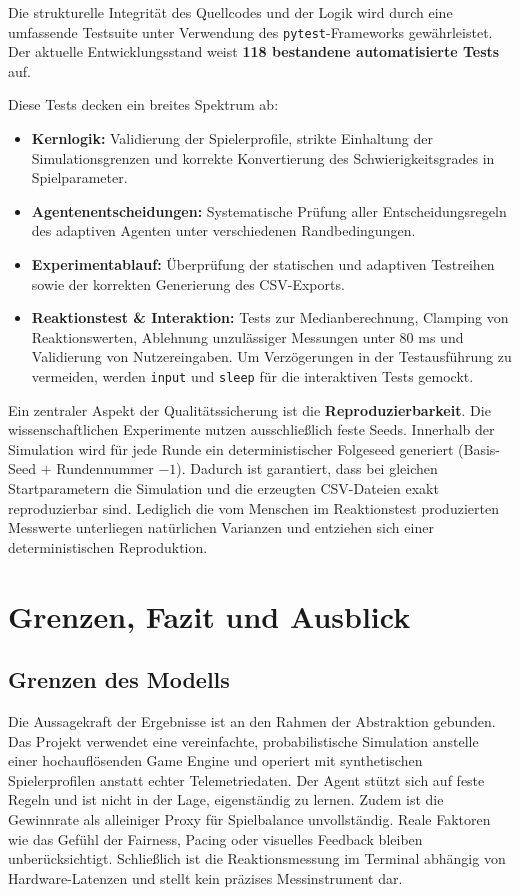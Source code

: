 \documentclass[11pt,a4paper]{article}
\begin{document}
Die strukturelle Integrität des Quellcodes und der Logik wird durch eine umfassende Testsuite unter Verwendung des \texttt{pytest}-Frameworks gewährleistet. Der aktuelle Entwicklungsstand weist \textbf{118 bestandene automatisierte Tests} auf.

Diese Tests decken ein breites Spektrum ab:
\begin{itemize}
    \item \textbf{Kernlogik:} Validierung der Spielerprofile, strikte Einhaltung der Simulationsgrenzen und korrekte Konvertierung des Schwierigkeitsgrades in Spielparameter.
    \item \textbf{Agentenentscheidungen:} Systematische Prüfung aller Entscheidungsregeln des adaptiven Agenten unter verschiedenen Randbedingungen.
    \item \textbf{Experimentablauf:} Überprüfung der statischen und adaptiven Testreihen sowie der korrekten Generierung des CSV-Exports.
    \item \textbf{Reaktionstest \& Interaktion:} Tests zur Medianberechnung, Clamping von Reaktionswerten, Ablehnung unzulässiger Messungen unter 80 ms und Validierung von Nutzereingaben. Um Verzögerungen in der Testausführung zu vermeiden, werden \texttt{input} und \texttt{sleep} für die interaktiven Tests gemockt.
\end{itemize}

Ein zentraler Aspekt der Qualitätssicherung ist die \textbf{Reproduzierbarkeit}. Die wissenschaftlichen Experimente nutzen ausschließlich feste Seeds. Innerhalb der Simulation wird für jede Runde ein deterministischer Folgeseed generiert (Basis-Seed $+$ Rundennummer $- 1$). Dadurch ist garantiert, dass bei gleichen Startparametern die Simulation und die erzeugten CSV-Dateien exakt reproduzierbar sind. Lediglich die vom Menschen im Reaktionstest produzierten Messwerte unterliegen natürlichen Varianzen und entziehen sich einer deterministischen Reproduktion.

\section{Grenzen, Fazit und Ausblick}

\subsection{Grenzen des Modells}
Die Aussagekraft der Ergebnisse ist an den Rahmen der Abstraktion gebunden. Das Projekt verwendet eine vereinfachte, probabilistische Simulation anstelle einer hochauflösenden Game Engine und operiert mit synthetischen Spielerprofilen anstatt echter Telemetriedaten. Der Agent stützt sich auf feste Regeln und ist nicht in der Lage, eigenständig zu lernen. Zudem ist die Gewinnrate als alleiniger Proxy für Spielbalance unvollständig. Reale Faktoren wie das Gefühl der Fairness, Pacing oder visuelles Feedback bleiben unberücksichtigt. Schließlich ist die Reaktionsmessung im Terminal abhängig von Hardware-Latenzen und stellt kein präzises Messinstrument dar.
\end{document}
